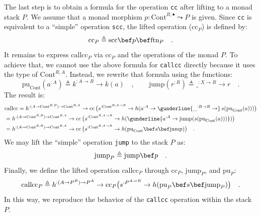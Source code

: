 The last step is to obtain a formula for the operation \lstinline!cc!
after lifting to a monad stack $P$. We assume that a monad morphism
$p:\text{Cont}^{R,\bullet}\leadsto P$ is given. Since \lstinline!cc!
is equivalent to a \textsf{``}simple\textsf{''} operation \lstinline!scc!, the lifted
operation ($\text{cc}_{P}$) is defined by:
\[
\text{cc}_{P}\triangleq\text{scc}\bef p\bef\text{ftn}_{P}\quad.
\]
It remains to express $\text{callcc}_{P}$ via $\text{cc}_{P}$ and
the operations of the monad $P$. To achieve that, we cannot use the
above formula for \lstinline!callcc! directly because it uses the
type of $\text{Cont}^{R,A}$. Instead, we rewrite that formula using
the functions:
\[
\text{pu}_{\text{Cont}}(a^{:A})\triangleq k^{:A\rightarrow R}\rightarrow k(a)\quad,\quad\quad\text{jump}(r^{:R})\triangleq\_^{:X\rightarrow R}\rightarrow r\quad.
\]
The result is:
\begin{align*}
 & \text{callcc}=h^{:(A\rightarrow\text{Cont}^{R,B})\rightarrow\text{Cont}^{R,A}}\rightarrow\text{cc}\,\big(s^{:\text{Cont}^{R,A\rightarrow R}}\rightarrow h(a^{:A}\rightarrow\gunderline{\_^{:B\rightarrow R}\rightarrow}\,s(\text{pu}_{\text{Cont}}(a)))\big)\\
 & =h^{:(A\rightarrow\text{Cont}^{R,B})\rightarrow\text{Cont}^{R,A}}\rightarrow\text{cc}\,\big(s^{:\text{Cont}^{R,A\rightarrow R}}\rightarrow h(\gunderline{a^{:A}\rightarrow\text{jump}(s(\text{pu}_{\text{Cont}}(a)))})\big)\\
 & =h^{:(A\rightarrow\text{Cont}^{R,B})\rightarrow\text{Cont}^{R,A}}\rightarrow\text{cc}\,\big(s^{:\text{Cont}^{R,A\rightarrow R}}\rightarrow h(\text{pu}_{\text{Cont}}\bef s\bef\text{jump})\big)\quad.
\end{align*}
We may lift the \textsf{``}simple\textsf{''} operation \lstinline!jump! to the stack
$P$ as:
\[
\text{jump}_{P}\triangleq\text{jump}\bef p\quad.
\]
Finally, we define the lifted operation $\text{callcc}_{P}$ through
$\text{cc}_{P}$, $\text{jump}_{P}$, and $\text{pu}_{P}$:
\[
\text{callcc}_{P}\triangleq h^{:(A\rightarrow P^{B})\rightarrow P^{A}}\rightarrow\text{cc}_{P}\big(s^{:P^{A\rightarrow R}}\rightarrow h(\text{pu}_{P}\bef s\bef\text{jump}_{P})\big)\quad.
\]
In this way, we reproduce the behavior of the \lstinline!callcc!
operation within the stack $P$.

